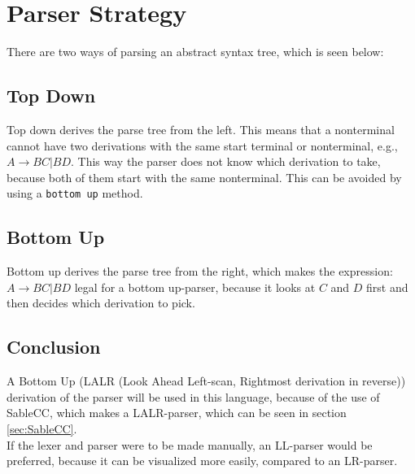 \section{Parser Strategy}
\label{Parserstrategy}
There are two ways of parsing an abstract syntax tree, which is seen below:

\subsection*{Top Down}
Top down derives the parse tree from the left. This means that a nonterminal cannot have two derivations with the same start terminal or nonterminal, e.g., $A \rightarrow BC | BD$. This way the parser does not know which derivation to take, because both of them start with the same nonterminal.
This can be avoided by using a \texttt{bottom up} method.

\subsection*{Bottom Up}
Bottom up derives the parse tree from the right, which makes the expression: $A \rightarrow BC | BD$ legal for a bottom up-parser, because it looks at $C$ and $D$ first and then decides which derivation to pick.

\subsection*{Conclusion}
A Bottom Up (LALR (Look Ahead Left-scan, Rightmost derivation in reverse)) derivation of the parser will be used in this language, because of the use of SableCC, which makes a LALR-parser, which can be seen in section \ref{sec:SableCC}. \\
If the lexer and parser were to be made manually, an LL-parser would be preferred, because it can be visualized more easily, compared to an LR-parser.